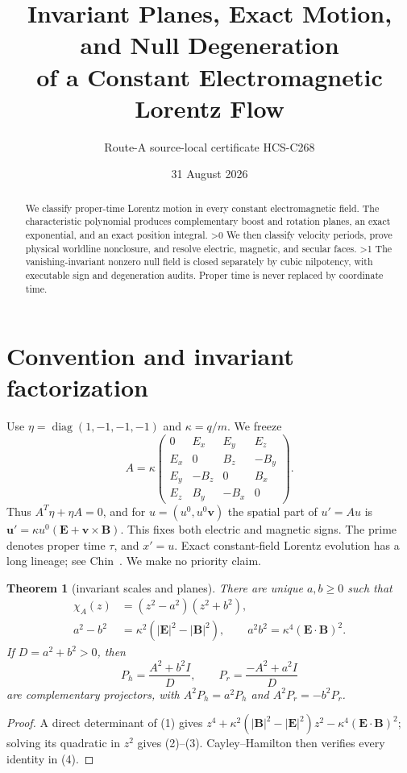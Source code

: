 \documentclass[10pt]{article}
\title{Invariant Planes, Exact Motion, and Null Degeneration\\of a Constant Electromagnetic Lorentz Flow}
\author{Route-A source-local certificate HCS-C268}
\date{31 August 2026}
\providecommand{\CRevisionRound}{2}
\newtheorem{theorem}{Theorem}
\begin{document}
\maketitle
\begin{abstract}
We classify proper-time Lorentz motion in every constant electromagnetic field.
The characteristic polynomial produces complementary boost and rotation planes,
an exact exponential, and an exact position integral.
\ifnum\CRevisionRound>0 We then classify velocity periods, prove physical
worldline nonclosure, and resolve electric, magnetic, and secular faces.\fi\space
\ifnum\CRevisionRound>1 The vanishing-invariant nonzero null field is closed
separately by cubic nilpotency, with executable sign and degeneration audits.\fi\space
Proper time is never replaced by coordinate time.
\end{abstract}

\section{Convention and invariant factorization}
Use $\eta=\operatorname{diag}(1,-1,-1,-1)$ and $\kappa=q/m$.  We freeze
\begin{equation}
 A=\kappa\begin{pmatrix}
0&E_x&E_y&E_z\\ E_x&0&B_z&-B_y\\ E_y&-B_z&0&B_x\\ E_z&B_y&-B_x&0
\end{pmatrix}.                                                   \tag{1}
\end{equation}
Thus $A^T\eta+\eta A=0$, and for $u=(u^0,u^0\mathbf v)$ the spatial
part of $u'=Au$ is
$\mathbf u'=\kappa u^0(\mathbf E+\mathbf v\times\mathbf B)$.
This fixes both electric and magnetic signs.  The prime denotes proper time
$\tau$, and $x'=u$.  Exact constant-field Lorentz evolution has a long
lineage; see Chin~\cite{Chin}.  We make no priority claim.

\begin{theorem}[invariant scales and planes]
There are unique $a,b\ge0$ such that
\begin{align}
 \chi_A(z)&=(z^2-a^2)(z^2+b^2),                              \tag{2}\\
 a^2-b^2&=\kappa^2(|\mathbf E|^2-|\mathbf B|^2),\qquad
 a^2b^2=\kappa^4(\mathbf E\!\cdot\!\mathbf B)^2.            \tag{3}
\end{align}
If $D=a^2+b^2>0$, then
\begin{equation}
 P_h=\frac{A^2+b^2I}{D},\qquad P_r=\frac{-A^2+a^2I}{D}        \tag{4}
\end{equation}
are complementary projectors, with $A^2P_h=a^2P_h$ and
$A^2P_r=-b^2P_r$.
\end{theorem}
\begin{proof}
A direct determinant of (1) gives
$z^4+\kappa^2(|\mathbf B|^2-|\mathbf E|^2)z^2
-\kappa^4(\mathbf E\cdot\mathbf B)^2$; solving its quadratic in $z^2$
gives (2)--(3).  Cayley--Hamilton then verifies every identity in (4).
\end{proof}
\end{document}
